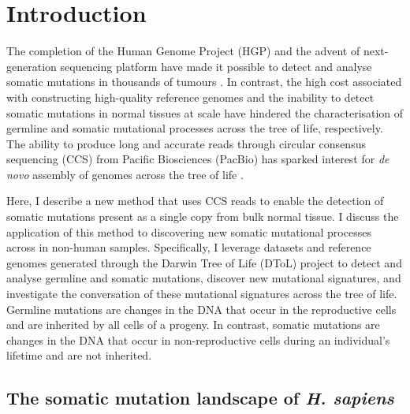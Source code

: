 
\chapter{Introduction}  %

\ifpdf
    \graphicspath{{Chapter1/Figs/Raster/}{Chapter1/Figs/PDF/}{Chapter1/Figs/}}
\else
    \graphicspath{{Chapter1/Figs/Vector/}{Chapter1/Figs/}}
\fi

The completion of the Human Genome Project (HGP) \cite{Lander2001-du} and the advent of next-generation sequencing platform \cite{Bentley2008-kl} have made it possible to detect and analyse somatic mutations in thousands of tumours \cite{Weinstein2013-ko, ICGCTCGA_Pan-Cancer_Analysis_of_Whole_Genomes_Consortium2020-ts}. In contrast, the high cost associated with constructing high-quality reference genomes and the inability to detect somatic mutations in normal tissues at scale have hindered the characterisation of germline and somatic mutational processes across the tree of life, respectively. The ability to produce long and accurate reads through circular consensus sequencing (CCS) from Pacific Biosciences (PacBio) \cite{Wenger2019-pw} has sparked interest for \textit{de novo} assembly of genomes across the tree of life \cite{Darwin_Tree_of_Life_Project_Consortium2022-ma}. 

Here, I describe a new method that uses CCS reads to enable the detection of somatic mutations present as a single copy from bulk normal tissue. I discuss the application of this method to discovering new somatic mutational processes across in non-human samples.  Specifically, I leverage datasets and reference genomes generated through the Darwin Tree of Life (DToL) project to detect and analyse germline and somatic mutations, discover new mutational signatures, and investigate the conversation of these mutational signatures across the tree of life. Germline mutations are changes in the DNA that occur in the reproductive cells and are inherited by all cells of a progeny. In contrast, somatic mutations are changes in the DNA that occur in non-reproductive cells during an individual’s lifetime and are not inherited.

\section{The somatic mutation landscape of \textit{H. sapiens}}

